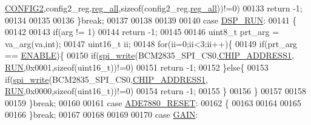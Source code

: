 \begin{DoxyCode}
      \hyperlink{a00036_a9989dac1034e36497f2f4f81613cab88}{CONFIG2},config2\_reg.\hyperlink{a00022_ab2957613fa7f241407cc98e80676dccf}{reg\_all},\textcolor{keyword}{sizeof}(config2\_reg.\hyperlink{a00022_ab2957613fa7f241407cc98e80676dccf}{reg\_all}))!=0)
00133                             \textcolor{keywordflow}{return} -1; 
00134                             
00135                 
00136                 \}\textcolor{keywordflow}{break};
00137                 
00138                 
00139                   
00140                 \textcolor{keywordflow}{case} \hyperlink{a00043_a1805e103988f08b8fac817624918cf47}{DSP\_RUN}:
00141                 \{
00142                 
00143                     \textcolor{keywordflow}{if}(arg != 1)
00144                      \textcolor{keywordflow}{return} -1;
00145                                                                             
00146                     uint8\_t prt\_arg = va\_arg(va,\textcolor{keywordtype}{int});
00147                     uint16\_t ii;
00148                     \textcolor{keywordflow}{for}(ii=0;ii<3;ii++)\{
00149                     \textcolor{keywordflow}{if}(prt\_arg == \hyperlink{a00037_a514ad415fb6125ba296793df7d1a468a}{ENABLE})\{
00150                     \textcolor{keywordflow}{if}(\hyperlink{a00007_ga2770219ad8ad1eda1817c0df934b47d0}{spi\_write}(BCM2835\_SPI\_CS0,\hyperlink{a00037_a94de2b046db6e10257ef4481c0a15eaa}{CHIP\_ADDRESS1},
      \hyperlink{a00036_a35f69a612b07bbf1de53bbbd8d877c09}{RUN},0x0001,\textcolor{keyword}{sizeof}(uint16\_t))!=0)
00151                     \textcolor{keywordflow}{return} -1;
00152                     \}\textcolor{keywordflow}{else}\{
00153                     \textcolor{keywordflow}{if}(\hyperlink{a00007_ga2770219ad8ad1eda1817c0df934b47d0}{spi\_write}(BCM2835\_SPI\_CS0,\hyperlink{a00037_a94de2b046db6e10257ef4481c0a15eaa}{CHIP\_ADDRESS1},
      \hyperlink{a00036_a35f69a612b07bbf1de53bbbd8d877c09}{RUN},0x0000,\textcolor{keyword}{sizeof}(uint16\_t))!=0)
00154                     \textcolor{keywordflow}{return} -1;
00155                     \}
00156                     \}
00157                  
00158         
00159                 \}\textcolor{keywordflow}{break};
00160                 
00161                 \textcolor{keywordflow}{case}  \hyperlink{a00043_af6e27751df5653af1abdb5c1c505b7e1}{ADE7880\_RESET}:
00162                 \{
00163                 
00164                     
00165                     
00166                 \}\textcolor{keywordflow}{break};
00167                 
00168                 
00169                 
00170                 \textcolor{keywordflow}{case}  \hyperlink{a00036_a8c8f27b35dfa40ccf31c1ee31479a31c}{GAIN}:

\end{DoxyCode}
